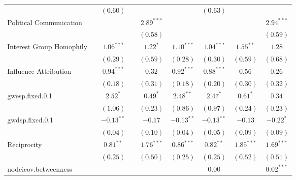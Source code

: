 \documentclass[fleqn,12pt]{wlscirep}
\begin{document}
\begin{landscape}
\begin{table}
\begin{center}
\begin{tabular}{l c c c c c c c c }
                        &               & $(0.60)$      &               &               &               & $(0.63)$      &               &               \\
Political Communication          &               &               &               & $2.89^{***}$  &               &               &               & $2.94^{***}$  \\
                        &               &               &               & $(0.58)$      &               &               &               & $(0.59)$      \\
Interest Group Homophily       &               & $1.06^{***}$  &               & $1.22^{*}$    & $1.10^{***}$  & $1.04^{***}$  & $1.55^{**}$   & $1.28$        \\
                        &               & $(0.29)$      &               & $(0.59)$      & $(0.28)$      & $(0.30)$      & $(0.59)$      & $(0.68)$      \\
Influence Attribution       &               & $0.94^{***}$  &               & $0.32$        & $0.92^{***}$  & $0.88^{***}$  & $0.56$        & $0.26$        \\
                        &               & $(0.18)$      &               & $(0.31)$      & $(0.18)$      & $(0.20)$      & $(0.30)$      & $(0.32)$      \\
gwesp.fixed.0.1         &               & $2.52^{*}$    &               & $0.49^{*}$    & $2.48^{**}$   & $2.47^{*}$    & $0.61^{*}$    & $0.34$        \\
                        &               & $(1.06)$      &               & $(0.23)$      & $(0.86)$      & $(0.97)$      & $(0.24)$      & $(0.23)$      \\
gwdsp.fixed.0.1         &               & $-0.13^{**}$  &               & $-0.17$       & $-0.13^{**}$  & $-0.13^{**}$  & $-0.13$       & $-0.22^{*}$   \\
                        &               & $(0.04)$      &               & $(0.10)$      & $(0.04)$      & $(0.05)$      & $(0.09)$      & $(0.09)$      \\
Reciprocity                 &               & $0.81^{**}$   &               & $1.76^{***}$  & $0.86^{***}$  & $0.82^{**}$   & $1.85^{***}$  & $1.69^{***}$  \\
                        &               & $(0.25)$      &               & $(0.50)$      & $(0.25)$      & $(0.25)$      & $(0.52)$      & $(0.51)$      \\
nodeicov.betweenness    &               &               &               &               &               & $0.00$        &               & $0.02^{***}$  \\

\end{tabular}
\end{center}
\end{table}
\end{landscape}
\end{document}
